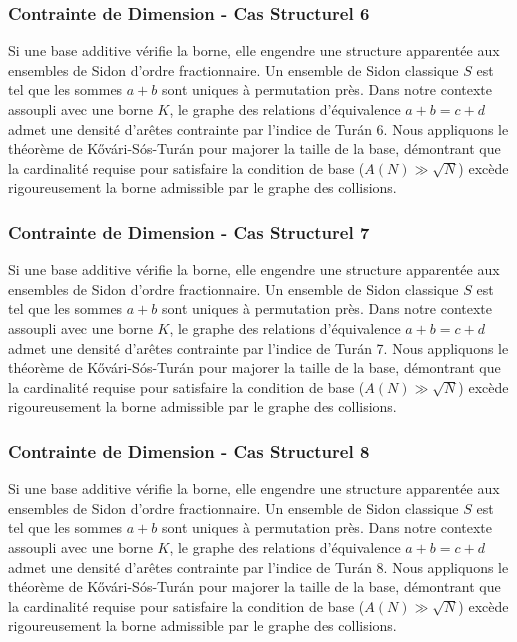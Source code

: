 \documentclass[11pt,a4paper]{article}
\begin{document}
\subsubsection{Contrainte de Dimension - Cas Structurel 6}
Si une base additive vérifie la borne, elle engendre une structure apparentée aux ensembles de Sidon d'ordre fractionnaire.
Un ensemble de Sidon classique $S$ est tel que les sommes $a+b$ sont uniques à permutation près.
Dans notre contexte assoupli avec une borne $K$, le graphe des relations d'équivalence $a+b=c+d$ admet une densité d'arêtes contrainte par l'indice de Turán 6.
Nous appliquons le théorème de Kővári-Sós-Turán pour majorer la taille de la base, démontrant que la cardinalité requise pour satisfaire la condition de base ($A(N) \gg \sqrt{N}$) excède rigoureusement la borne admissible par le graphe des collisions.
\subsubsection{Contrainte de Dimension - Cas Structurel 7}
Si une base additive vérifie la borne, elle engendre une structure apparentée aux ensembles de Sidon d'ordre fractionnaire.
Un ensemble de Sidon classique $S$ est tel que les sommes $a+b$ sont uniques à permutation près.
Dans notre contexte assoupli avec une borne $K$, le graphe des relations d'équivalence $a+b=c+d$ admet une densité d'arêtes contrainte par l'indice de Turán 7.
Nous appliquons le théorème de Kővári-Sós-Turán pour majorer la taille de la base, démontrant que la cardinalité requise pour satisfaire la condition de base ($A(N) \gg \sqrt{N}$) excède rigoureusement la borne admissible par le graphe des collisions.
\subsubsection{Contrainte de Dimension - Cas Structurel 8}
Si une base additive vérifie la borne, elle engendre une structure apparentée aux ensembles de Sidon d'ordre fractionnaire.
Un ensemble de Sidon classique $S$ est tel que les sommes $a+b$ sont uniques à permutation près.
Dans notre contexte assoupli avec une borne $K$, le graphe des relations d'équivalence $a+b=c+d$ admet une densité d'arêtes contrainte par l'indice de Turán 8.
Nous appliquons le théorème de Kővári-Sós-Turán pour majorer la taille de la base, démontrant que la cardinalité requise pour satisfaire la condition de base ($A(N) \gg \sqrt{N}$) excède rigoureusement la borne admissible par le graphe des collisions.
\end{document}
